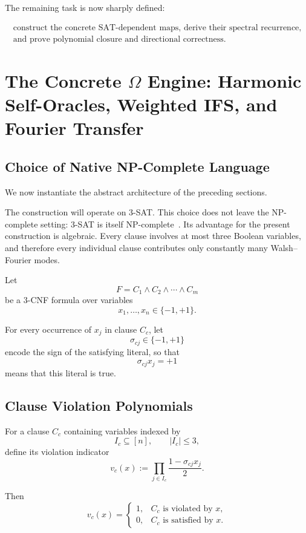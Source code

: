 \documentclass[11pt]{article}
\theoremstyle{plain}
\theoremstyle{definition}
\begin{document}
The remaining task is now sharply defined:

\[
\boxed{\begin{gathered}
\text{construct the concrete SAT-dependent maps, derive their spectral recurrence,}\\
\text{and prove polynomial closure and directional correctness}.
\end{gathered}}
\]

\section{The Concrete \texorpdfstring{\(\Omega\)}{Omega} Engine:
Harmonic Self-Oracles, Weighted IFS, and Fourier Transfer}
\label{sec:concrete-omega-engine}

\subsection{Choice of Native NP-Complete Language}

We now instantiate the abstract architecture of the preceding sections.

The construction will operate on \textsc{3-SAT}.  This choice does not leave
the NP-complete setting: \textsc{3-SAT} is itself NP-complete~\cite{GareyJohnson1979}.  Its advantage
for the present construction is algebraic.  Every clause involves at most
three Boolean variables, and therefore every individual clause contributes
only constantly many Walsh--Fourier modes.

Let
\[
    F=C_1\land C_2\land\cdots\land C_m
\]
be a 3-CNF formula over variables
\[
    x_1,\dots,x_n\in\{-1,+1\}.
\]

For every occurrence of \(x_j\) in clause \(C_c\), let
\[
    \sigma_{cj}\in\{-1,+1\}
\]
encode the sign of the satisfying literal, so that
\[
    \sigma_{cj}x_j=+1
\]
means that this literal is true.

\subsection{Clause Violation Polynomials}

For a clause \(C_c\) containing variables indexed by
\[
    I_c\subseteq[n],
    \qquad
    |I_c|\leq 3,
\]
define its violation indicator
\[
    v_c(x)
    :=
    \prod_{j\in I_c}
    \frac{1-\sigma_{cj}x_j}{2}.
\]

Then
\[
    v_c(x)
    =
    \begin{cases}
        1,&C_c\text{ is violated by }x,\\
        0,&C_c\text{ is satisfied by }x.
    \end{cases}
\]
\end{document}
